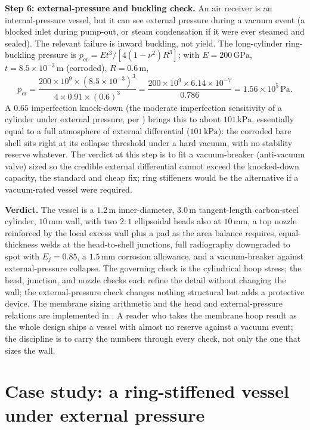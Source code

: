 \textbf{Step 6: external-pressure and buckling check.} An air receiver
is an internal-pressure vessel, but it can see external pressure during
a vacuum event (a blocked inlet during pump-out, or steam condensation
if it were ever steamed and sealed). The relevant failure is inward
buckling, not yield. The long-cylinder ring-buckling pressure is
$p_{\text{cr}} = E t^3/[4(1-\nu^2)R^3]$; with $E = 200\,\text{GPa}$,
$t = 8.5\times 10^{-3}\,\si{\meter}$ (corroded), $R = 0.6\,\si{\meter}$,
\[
p_{\text{cr}} = \frac{200\times 10^9\times (8.5\times 10^{-3})^3}
{4\times 0.91\times (0.6)^3}
= \frac{200\times 10^9\times 6.14\times 10^{-7}}{0.786}
= 1.56\times 10^5\,\text{Pa}.
\]
A $0.65$ imperfection knock-down (the moderate imperfection sensitivity of
a cylinder under external pressure, per )
brings this to about $101\,\text{kPa}$, essentially equal to a full
atmosphere of external differential ($101\,\text{kPa}$): the corroded bare
shell sits right at its collapse threshold under a hard vacuum, with no
stability reserve whatever. The verdict at this
step is to fit a vacuum-breaker (anti-vacuum valve) sized so the
credible external differential cannot exceed the knocked-down capacity,
the standard and cheap fix; ring stiffeners would be the alternative if
a vacuum-rated vessel were required.

\textbf{Verdict.} The vessel is a $1.2\,\si{\meter}$ inner-diameter,
$3.0\,\si{\meter}$ tangent-length carbon-steel cylinder, $10\,\si{
\milli\meter}$ wall, with two $2{:}1$ ellipsoidal heads also at
$10\,\si{\milli\meter}$, a top nozzle reinforced by the local excess
wall plus a pad as the area balance requires, equal-thickness welds at
the head-to-shell junctions, full radiography downgraded to spot with
$E_j = 0.85$, a $1.5\,\si{\milli\meter}$ corrosion allowance, and a
vacuum-breaker against external-pressure collapse. The governing check
is the cylindrical hoop stress; the head, junction, and nozzle checks
each refine the detail without changing the wall; the external-pressure
check changes nothing structural but adds a protective device. The
membrane sizing arithmetic and the head and external-pressure relations
are implemented in . A reader who
takes the membrane hoop result as the whole design ships a vessel with
almost no reserve against a vacuum event; the discipline is to carry the
numbers through every check, not only the one that sizes the wall.

\section{Case study: a ring-stiffened vessel under external
pressure}

